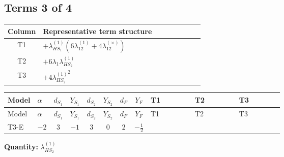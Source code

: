 \documentclass[8pt]{article}
\begin{document}
\begin{landscape}
\subsection*{Terms 3 of 4}
\begin{center}
\begin{tabular}{@{}c >{\raggedright\arraybackslash}p{0.82\linewidth}@{}}
\toprule
Column & Representative term structure \\
\midrule
T1 & \(\displaystyle +{\lambda_{HS_1}^{(1)}} (6 {\lambda_{12}^{(1)}}+4 {\lambda_{12}^{(\times)}})\) \\
\midrule
T2 & \(\displaystyle +6 {\lambda_1} {\lambda_{HS_2}^{(1)}}\) \\
\midrule
T3 & \(\displaystyle +4 {\lambda_{HS_2}^{(1)}}^2\) \\
\midrule
\bottomrule
\end{tabular}
\end{center}
\smallskip
\tiny
\begin{longtable}{@{}llcccccc >{\raggedright\arraybackslash}p{0.21\linewidth} >{\raggedright\arraybackslash}p{0.21\linewidth} >{\raggedright\arraybackslash}p{0.21\linewidth}@{}}
\toprule
Model & $\alpha$ & $d_{S_1}$ & $Y_{S_1}$ & $d_{S_2}$ & $Y_{S_2}$ & $d_F$ & $Y_F$ & T1 & T2 & T3 \\
\midrule
\endfirsthead
\toprule
Model & $\alpha$ & $d_{S_1}$ & $Y_{S_1}$ & $d_{S_2}$ & $Y_{S_2}$ & $d_F$ & $Y_F$ & T1 & T2 & T3 \\
\midrule
\endhead
T3-E & $-2$ & $3$ & $-1$ & $3$ & $0$ & $2$ & $-\frac{1}{2}$ & \scriptsize\adjustbox{max width=\linewidth}{$\begin{gathered} +{\lambda_{HS_1}^{(1)}} (6 {\lambda_{12}^{(1)}}+4 {\lambda_{12}^{(\times)}})\end{gathered}$} & \scriptsize\adjustbox{max width=\linewidth}{$\begin{gathered} +6 {\lambda_1} {\lambda_{HS_2}^{(1)}}\end{gathered}$} & \scriptsize\adjustbox{max width=\linewidth}{$\begin{gathered} +4 {\lambda_{HS_2}^{(1)}}^2\end{gathered}$} \\
\midrule
\bottomrule
\end{longtable}
\clearpage
\noindent\textbf{Quantity: }$\lambda_{HS_2}^{(1)}$\par\smallskip

\end{landscape}
\end{document}
